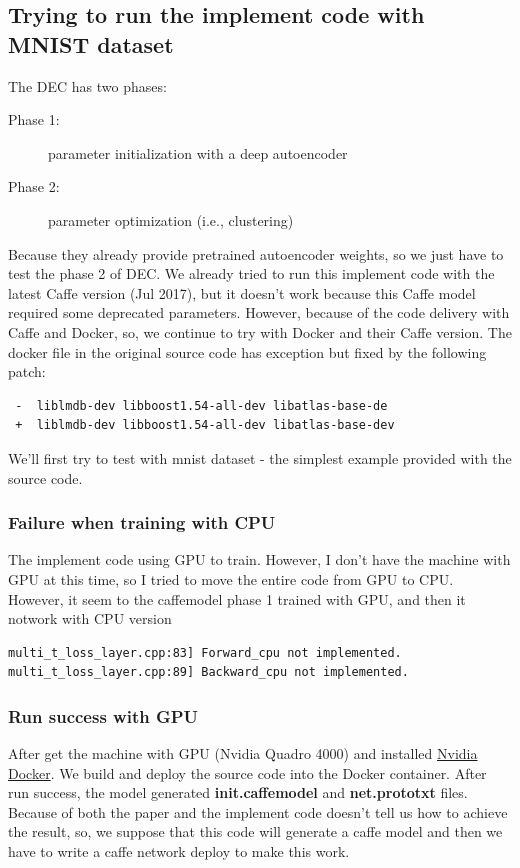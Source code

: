 \documentclass[11pt]{article}
\begin{document}
\subsection{Trying to run the implement code with MNIST dataset}
The DEC has two phases:
\begin{description}
\item[Phase 1:]  parameter initialization with a deep autoencoder
\item[Phase 2:]  parameter optimization (i.e., clustering)
\end{description}
Because they already provide pretrained autoencoder weights, so we just have to test the phase 2 of DEC.\newline
We already tried to run this implement code with the latest Caffe version (Jul 2017), but it doesn't work because this Caffe model required some deprecated parameters. However, because of the code delivery with Caffe and Docker, so, we continue to try with Docker and their Caffe version.
The docker file in the original source code has exception but fixed by the following patch:
\begin{verbatim}
 -  liblmdb-dev libboost1.54-all-dev libatlas-base-de
 +  liblmdb-dev libboost1.54-all-dev libatlas-base-dev
\end{verbatim}
We'll first try to test with mnist dataset - the simplest example provided with the source code.
\subsubsection{Failure when training with CPU}
The implement code using GPU to train. However, I don't have the machine with GPU at this time, so I tried to move the entire code from GPU to CPU. However, it seem to the caffemodel phase 1 trained with GPU, and then it notwork with CPU version
\begin{verbatim}
multi_t_loss_layer.cpp:83] Forward_cpu not implemented.
multi_t_loss_layer.cpp:89] Backward_cpu not implemented.
\end{verbatim}

\subsubsection{Run success with GPU}

After get the machine with GPU (Nvidia Quadro 4000) and installed \href{https://github.com/NVIDIA/nvidia-docker}{Nvidia Docker}. We build and deploy the source code into the Docker container.\newline
After run success, the model generated \textbf{init.caffemodel} and \textbf{net.prototxt} files.\newline
Because of both the paper and the implement code doesn't tell us how to achieve the result, so, we suppose that this code will generate a caffe model and then we have to write a caffe network deploy to make this work.
\end{document}
